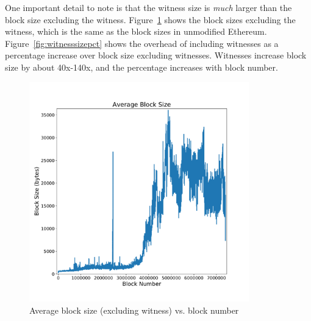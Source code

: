 \documentclass[12pt]{article}
\newcommand{\figurewidth}{0.85\textwidth}
\begin{document}
One important detail to note is that the witness size is \emph{much} larger than the block size excluding the witness. Figure~\ref{fig:blocksize} shows the block sizes excluding the witness, which is the same as the block sizes in unmodified Ethereum. Figure~\ref{fig:witnesssizepct} shows the overhead of including witnesses as a percentage increase over block size excluding witnesses. Witnesses increase block size by about 40x-140x, and the percentage increases with block number.

\begin{figure}[H]
  \centering
  \includegraphics[width=\figurewidth]{../figures/results/graphs/background/block-size.pdf}
  \caption{Average block size (excluding witness) vs. block number}
  \label{fig:blocksize}
\end{figure}
\end{document}
